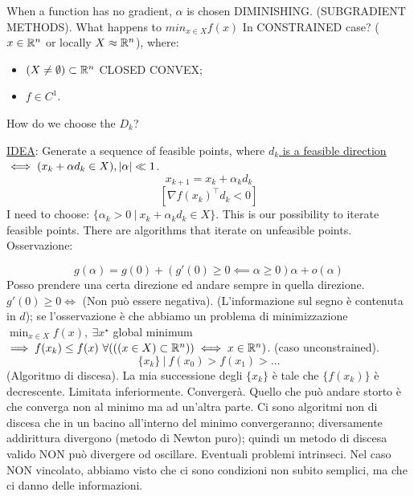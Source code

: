 When a function has no gradient, $\alpha$ is chosen DIMINISHING. (SUBGRADIENT METHODS).
What happens to $min_{x\in X}{f(x)}$ In CONSTRAINED case? ($x\in\mathbb{R}^n$ or locally $X \approx \mathbb{R}^n$), where:
\begin{itemize}
\item $(X \neq \emptyset) \subset \mathbb{R}^n$ CLOSED CONVEX;
\item $f\in C^1$.
\end{itemize}
How do we choose the $D_k$?

\underline{IDEA}: Generate a sequence of feasible points, where \underline{$d_k$ is a feasible direction} $\iff (x_k+\alpha d_k \in X), \lvert\alpha\rvert \ll 1$.
\[
	x_{k+1} = x_k + \alpha_kd_k
\]
\[
	[\nabla{f(x_k)}^\top d_k < 0]
\]
I need to choose: $\{\alpha_k > 0\ |\ x_k+\alpha_kd_k \in X\}$. This is our possibility to iterate feasible points. There are algorithms that iterate on unfeasible points.
Osservazione:

\[	
	g(\alpha) = g(0) + (g'(0)\geq 0 \impliedby \alpha\geq 0)\alpha + o(\alpha)
\]
Posso prendere una certa direzione ed andare sempre in quella direzione. $g'(0)\geq 0 \iff$ (Non può essere negativa). (L'informazione sul segno è contenuta in $d$); se l'osservazione è che abbiamo un problema di minimizzazione $\min_{x\in X}{f(x)},\ \exists x^\star$ global minimum $\implies f(x_k) \leq f(x)\ \forall (((x\in X)\subset \R^n))\iff x\in\R^n)$. (caso unconstrained).
\[
	\{x_k\}\ |\ f(x_0) > f(x_1) > \dots
\]
(Algoritmo di discesa). La mia successione degli $\{x_k\}$ è tale che $\{f(x_k)\}$ è decrescente.  Limitata inferiormente. Convergerà. Quello che può andare storto è che converga non al minimo ma ad un'altra parte. Ci sono algoritmi non di discesa che in un bacino all'interno del minimo convergeranno; diversamente addirittura divergono (metodo di Newton puro); quindi un metodo di discesa valido NON può divergere od oscillare. Eventuali problemi intrinseci. Nel caso NON vincolato, abbiamo visto che ci sono condizioni non subito semplici, ma che ci danno delle informazioni.

